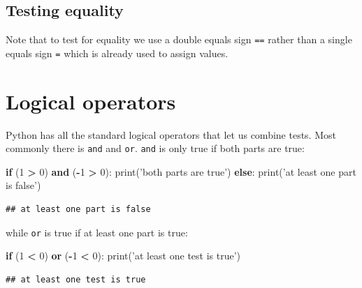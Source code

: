 \documentclass[]{book}
\newenvironment{Shaded}{\begin{snugshade}}{\end{snugshade}}
\newcommand{\BuiltInTok}[1]{#1}
\newcommand{\ControlFlowTok}[1]{\textcolor[rgb]{0.13,0.29,0.53}{\textbf{#1}}}
\newcommand{\DecValTok}[1]{\textcolor[rgb]{0.00,0.00,0.81}{#1}}
\newcommand{\KeywordTok}[1]{\textcolor[rgb]{0.13,0.29,0.53}{\textbf{#1}}}
\newcommand{\NormalTok}[1]{#1}
\newcommand{\OperatorTok}[1]{\textcolor[rgb]{0.81,0.36,0.00}{\textbf{#1}}}
\newcommand{\StringTok}[1]{\textcolor[rgb]{0.31,0.60,0.02}{#1}}
\theoremstyle{definition}
\theoremstyle{definition}
\theoremstyle{definition}
\theoremstyle{remark}
\begin{document}
\hypertarget{testing-equality}{%
\subsection{Testing equality}\label{testing-equality}}

Note that to test for equality we use a double equals sign \texttt{==}
rather than a single equals sign \texttt{=} which is already used to
assign values.

\hypertarget{logical-operators}{%
\section{Logical operators}\label{logical-operators}}

Python has all the standard logical operators that let us combine tests.
Most commonly there is \texttt{and} and \texttt{or}. \texttt{and} is
only true if both parts are true:

\begin{Shaded}
\begin{Highlighting}[]
\ControlFlowTok{if}\NormalTok{ (}\DecValTok{1} \OperatorTok{>} \DecValTok{0}\NormalTok{) }\KeywordTok{and}\NormalTok{ (}\OperatorTok{-}\DecValTok{1} \OperatorTok{>} \DecValTok{0}\NormalTok{):}
    \BuiltInTok{print}\NormalTok{(}\StringTok{'both parts are true'}\NormalTok{)}
\ControlFlowTok{else}\NormalTok{:}
    \BuiltInTok{print}\NormalTok{(}\StringTok{'at least one part is false'}\NormalTok{)}
\end{Highlighting}
\end{Shaded}

\begin{verbatim}
## at least one part is false
\end{verbatim}

while \texttt{or} is true if at least one part is true:

\begin{Shaded}
\begin{Highlighting}[]
\ControlFlowTok{if}\NormalTok{ (}\DecValTok{1} \OperatorTok{<} \DecValTok{0}\NormalTok{) }\KeywordTok{or}\NormalTok{ (}\OperatorTok{-}\DecValTok{1} \OperatorTok{<} \DecValTok{0}\NormalTok{):}
    \BuiltInTok{print}\NormalTok{(}\StringTok{'at least one test is true'}\NormalTok{)}
\end{Highlighting}
\end{Shaded}

\begin{verbatim}
## at least one test is true
\end{verbatim}
\end{document}
